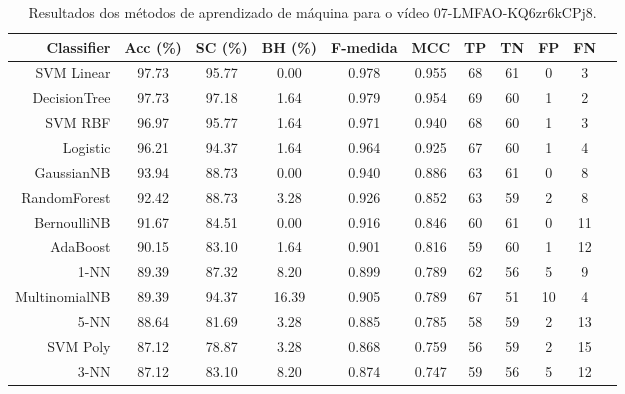 \begin{table}[!htb]
\centering
\caption{Resultados dos métodos de aprendizado de máquina para o vídeo 07-LMFAO-KQ6zr6kCPj8.}
\label{tab:07-LMFAO-KQ6zr6kCPj8}
\begin{tabular}{r|c|c|c|c|c|c|c|c|c|c}
\hline\hline
Classifier & Acc (\%) & SC (\%) & BH (\%) & F-medida & MCC & TP & TN & FP & FN \\ \hline
SVM Linear & 97.73 & 95.77 & 0.00 & 0.978 & 0.955 & 68 & 61 & 0 & 3 \\ 
DecisionTree & 97.73 & 97.18 & 1.64 & 0.979 & 0.954 & 69 & 60 & 1 & 2 \\ 
SVM RBF & 96.97 & 95.77 & 1.64 & 0.971 & 0.940 & 68 & 60 & 1 & 3 \\ 
Logistic & 96.21 & 94.37 & 1.64 & 0.964 & 0.925 & 67 & 60 & 1 & 4 \\ 
GaussianNB & 93.94 & 88.73 & 0.00 & 0.940 & 0.886 & 63 & 61 & 0 & 8 \\ 
RandomForest & 92.42 & 88.73 & 3.28 & 0.926 & 0.852 & 63 & 59 & 2 & 8 \\ 
BernoulliNB & 91.67 & 84.51 & 0.00 & 0.916 & 0.846 & 60 & 61 & 0 & 11 \\ 
AdaBoost & 90.15 & 83.10 & 1.64 & 0.901 & 0.816 & 59 & 60 & 1 & 12 \\ 
1-NN & 89.39 & 87.32 & 8.20 & 0.899 & 0.789 & 62 & 56 & 5 & 9 \\ 
MultinomialNB & 89.39 & 94.37 & 16.39 & 0.905 & 0.789 & 67 & 51 & 10 & 4 \\ 
5-NN & 88.64 & 81.69 & 3.28 & 0.885 & 0.785 & 58 & 59 & 2 & 13 \\ 
SVM Poly & 87.12 & 78.87 & 3.28 & 0.868 & 0.759 & 56 & 59 & 2 & 15 \\ 
3-NN & 87.12 & 83.10 & 8.20 & 0.874 & 0.747 & 59 & 56 & 5 & 12 \\ 
\hline\hline
\end{tabular}
\end{table}
